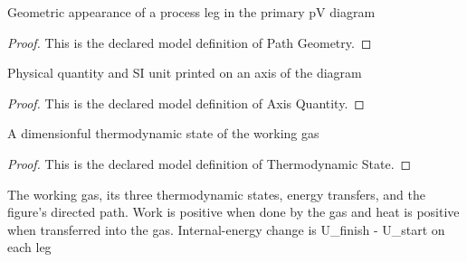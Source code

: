 \begin{definition}
  \label{def:physics:phyx-mini-0350:phyxminiproblems-problemphyxmini0350-pathgeometry}
  Geometric appearance of a process leg in the primary pV diagram
\end{definition}
\begin{proof}
  This is the declared model definition of Path Geometry.
\end{proof}
\begin{definition}
  \label{def:physics:phyx-mini-0350:phyxminiproblems-problemphyxmini0350-axisquantity}
  Physical quantity and SI unit printed on an axis of the diagram
\end{definition}
\begin{proof}
  This is the declared model definition of Axis Quantity.
\end{proof}
\begin{definition}
  \label{def:physics:phyx-mini-0350:phyxminiproblems-problemphyxmini0350-thermodynamicstate}
  A dimensionful thermodynamic state of the working gas
\end{definition}
\begin{proof}
  This is the declared model definition of Thermodynamic State.
\end{proof}
\begin{definition}
  \label{def:physics:phyx-mini-0350:phyxminiproblems-problemphyxmini0350-idealdiatomicheatenginecycle}
  The working gas, its three thermodynamic states, energy transfers, and the figure's directed path. Work is positive when done by the gas and heat is positive when transferred into the gas. Internal-energy change is U\_finish - U\_start on each leg
\end{definition}

